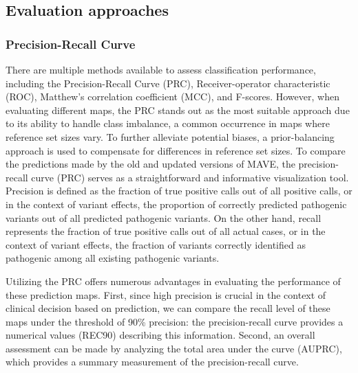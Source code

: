\documentclass{article}
\begin{document}



\subsection{Evaluation approaches} 
\subsubsection{Precision-Recall Curve}

There are multiple methods available to assess classification performance, including the Precision-Recall Curve (PRC), Receiver-operator characteristic (ROC)\cite{doi:10.1161/CIRCULATIONAHA.105.594929}, Matthew's correlation coefficient (MCC)\cite{chicco2020advantages}, and F-scores\cite{hicks_evaluation_2022}. However, when evaluating different maps, the PRC stands out as the most suitable approach due to its ability to handle class imbalance, a common occurrence in maps where reference set sizes vary. To further alleviate potential biases, a prior-balancing approach\cite{wu_improved_2021} is used to compensate for differences in reference set sizes. 
To compare the predictions made by the old and updated versions of MAVE, the precision-recall curve (PRC) serves as a straightforward and informative visualization tool.  Precision is defined as the fraction of true positive calls out of all positive calls, or in the context of variant effects, the proportion of correctly predicted pathogenic variants out of all predicted pathogenic variants. On the other hand, recall represents the fraction of true positive calls out of all actual cases, or in the context of variant effects, the fraction of variants correctly identified as pathogenic among all existing pathogenic variants.\cite{james_introduction_2021} 

Utilizing the PRC offers numerous advantages in evaluating the performance of these prediction maps.  First, since high precision is crucial in the context of clinical decision based on prediction, we can compare the recall level of these maps under the threshold of 90\% precision: the precision-recall curve provides a numerical values (REC90) describing this information. Second, an overall assessment can be made by analyzing the total area under the curve (AUPRC), which provides a summary measurement of the precision-recall curve. 
\end{document}
